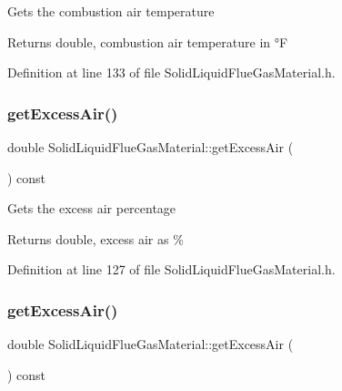 Gets the combustion air temperature \begin{DoxyReturn}{Returns}
double, combustion air temperature in °F 
\end{DoxyReturn}


Definition at line 133 of file Solid\+Liquid\+Flue\+Gas\+Material.\+h.

\mbox{\label{class_solid_liquid_flue_gas_material_a49e7bb4ebc45897c81b6f38610ceaf02}} 
\subsubsection{\texorpdfstring{get\+Excess\+Air()}{getExcessAir()}\hspace{0.1cm}{\footnotesize\ttfamily [1/3]}}
{\footnotesize\ttfamily double Solid\+Liquid\+Flue\+Gas\+Material\+::get\+Excess\+Air (\begin{DoxyParamCaption}{ }\end{DoxyParamCaption}) const\hspace{0.3cm}{\ttfamily [inline]}}

Gets the excess air percentage \begin{DoxyReturn}{Returns}
double, excess air as \% 
\end{DoxyReturn}


Definition at line 127 of file Solid\+Liquid\+Flue\+Gas\+Material.\+h.

\mbox{\label{class_solid_liquid_flue_gas_material_a49e7bb4ebc45897c81b6f38610ceaf02}} 
\subsubsection{\texorpdfstring{get\+Excess\+Air()}{getExcessAir()}\hspace{0.1cm}{\footnotesize\ttfamily [2/3]}}
{\footnotesize\ttfamily double Solid\+Liquid\+Flue\+Gas\+Material\+::get\+Excess\+Air (\begin{DoxyParamCaption}{ }\end{DoxyParamCaption}) const\hspace{0.3cm}{\ttfamily [inline]}}

